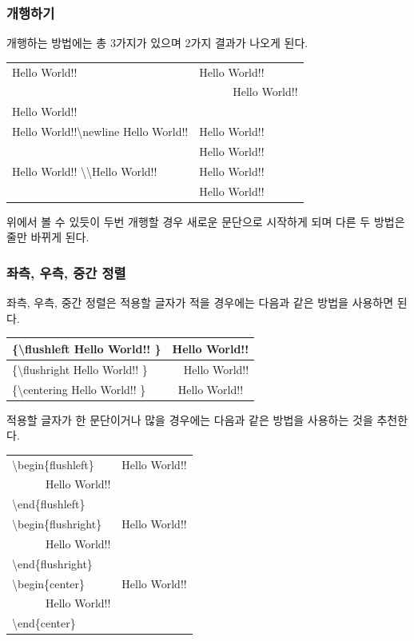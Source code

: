 \documentclass[12pt]{article}
\begin{document}
	\subsubsection{개행하기}
	개행하는 방법에는 총 3가지가 있으며 2가지 결과가 나오게 된다.\newline
	
	\begin{tabularx}{\textwidth \onehalfspacing}{|X|X|}
		\hline
		Hello World!! & Hello World!!\\
		\ & \ \ \ \ \ \ Hello World!!\\
		Hello World!! & \\
		\hline
		Hello World!!\textbackslash newline Hello World!! & Hello World!!\\
		\ &Hello World!!\\
		\hline
		Hello World!! \textbackslash \textbackslash Hello World!! & Hello World!!\\
		\ & Hello World!!\\
		\hline
	\end{tabularx}
	\newline
	\newline
	위에서 볼 수 있듯이 두번 개행할 경우 새로운 문단으로 시작하게 되며 다른 두 방법은 줄만 바뀌게 된다.
	\subsubsection{좌측, 우측, 중간 정렬}
	좌측, 우측, 중간 정렬은 적용할 글자가 적을 경우에는 다음과 같은 방법을 사용하면 된다.\newline
	
	\begin{tabularx}{\textwidth \onehalfspacing}{|X|X|}
		\hline
		\{\textbackslash flushleft Hello World!! \} & Hello World!!\\
		\hline
		\{\textbackslash flushright Hello World!! \} & \multicolumn{1}{r|}{Hello World!!}\\
		\hline
		\{\textbackslash centering Hello World!! \} & \multicolumn{1}{c|}{Hello World!!}\\
		\hline
	\end{tabularx}
	\clearpage
	적용할 글자가 한 문단이거나 많을 경우에는 다음과 같은 방법을 사용하는 것을 추천한다. \newline
	
	\begin{tabularx}{\textwidth \onehalfspacing}{|X|X|}
		\hline
		\textbackslash begin\{flushleft\} & Hello World!!\\
		\ \ \ \ \ \ Hello World!! & \\
		\textbackslash end\{flushleft\} & \\
		\hline
		\textbackslash begin\{flushright\} & \multicolumn{1}{r|}{Hello World!!}\\
		\ \ \ \ \ \ Hello World!! & \\
		\textbackslash end\{flushright\} & \\
		\hline
		\textbackslash begin\{center\} & \multicolumn{1}{c|}{Hello World!!}\\
		\ \ \ \ \ \ Hello World!! & \\
		\textbackslash end\{center\} & \\
		\hline
	\end{tabularx}
\end{document}
